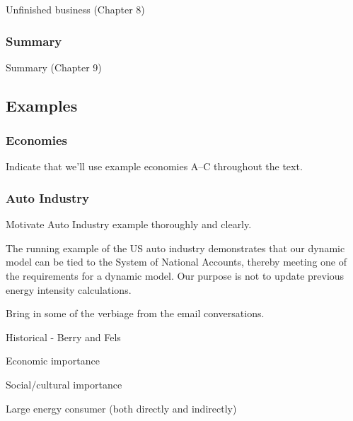 Unfinished business (Chapter 8)

\subsubsection{Summary}
\label{sec:summary}

Summary (Chapter 9)


\subsection{Examples}

\subsubsection{Economies}

Indicate that we'll use example economies A--C
throughout the text.


\subsubsection{Auto Industry}

Motivate Auto Industry example thoroughly and clearly. 

The running example of the US auto industry demonstrates that our dynamic model 
can be tied to the System of National Accounts, 
thereby meeting one of the requirements for a dynamic model. 
Our purpose is not to update previous energy intensity calculations.

Bring in some of the verbiage from the email conversations.

Historical - Berry and Fels

Economic importance

Social/cultural importance

Large energy consumer (both directly and indirectly)









